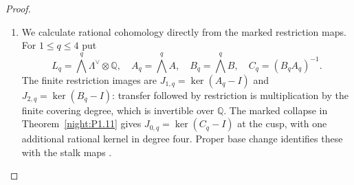 \begin{proof}
\begin{enumerate}[label={$\langle1\rangle$\arabic*.}]
We also record the invariant normal closure needed below. Let
$K$ be the smallest $\langle M_1,M_2\rangle$-invariant subgroup
containing $(M_0-I)\Lambda$, and let
$J=(M_1-I)\Lambda+(M_2-I)\Lambda=\ker\ell$.
The equality $\ell M_i=\ell$ gives $K\subseteq\ker\ell$.
On the abelian quotient $\Lambda/K$, the induced maps $a,b$
satisfy $ab=1$, $a^5=1$ and $b^4=1$. Thus $a^4=a^5=1$, so
$a=b=1$ and $J\subseteq K$. Consequently $K=J=\ker\ell$ as
integral subgroups.


Let $a_i$ be the two finite peripheral lifts. The universal covering
deck transformation of the $i$th cap has $m_i$th power equal to
translation by $v_i$, since $M_iv_i=v_i$. The collar map in
Step~1 sends $a_i$ to that transformation. Van Kampen therefore gives
\[
 a_i\lambda a_i^{-1}=M_i\lambda,
 \qquad a_1^5=v_1,\quad a_2^4=v_2,\quad a_1a_2=1.
\]
Write $a_1=t$ and $a_2=t^{-1}$. Then
$t=t^5t^{-4}=v_1+v_2$ lies in the abelian fibre subgroup. Conjugation
is consequently trivial, and that subgroup is a quotient of
$\Lambda_{\langle M_1,M_2\rangle}=\mathbb Z$, with coordinate $\ell$.
Now $\ell(v_1+v_2)=0$, so $t=0$, while $t^5=v_1$ kills its generator
$\ell(v_1)=1$. Every generator vanishes, proving $\pi_1=1$.
Equivalently, after this abelian reduction, the relations on
$(\ell,a_1,a_2)$ have matrix
\[
 \begin{pmatrix}-1&5&0\\1&0&4\\0&1&1\end{pmatrix},
 \qquad\det=-1.
\]

\item We calculate rational cohomology directly from the marked
restriction maps. For $1\leq q\leq4$ put
\[
 L_q=\bigwedge^q\Lambda^\vee\otimes\mathbb Q,
 \quad A_q=\bigwedge^qA,\quad B_q=\bigwedge^qB,
 \quad C_q=(B_qA_q)^{-1}.
\]
The finite restriction images are
$J_{1,q}=\ker(A_q-I)$ and $J_{2,q}=\ker(B_q-I)$: transfer followed
by restriction is multiplication by the finite covering degree,
which is invertible over $\mathbb Q$. The marked collapse in
Theorem~\ref{night:P1.11} gives
$J_{0,q}=\ker(C_q-I)$ at the cusp, with one additional rational
kernel in degree four. Proper base change identifies these with the
stalk maps
\cite[Tag 09V5, Lemma 20.18.1; chapter PDF p.~30]{StacksProject}.


\end{enumerate}
\end{proof}
